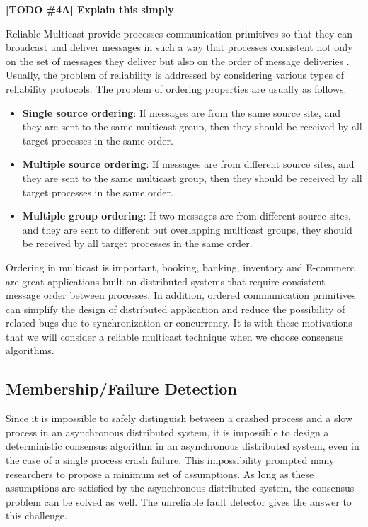 \documentclass[12pt, a4paper]{article}
\newcommand{\todo}[2]{\textbf{\color{blue}[TODO \##1] #2}\par}
\begin{document}
\todo{4A}{Explain this simply}

Reliable Multicast provide processes communication primitives so that they can broadcast and deliver messages in such a way that processes consistent not only on the set of messages they deliver but also on the order of message deliveries \cite{fritzke2001consensus}. Usually, the problem of reliability is addressed by considering various types of reliability protocols. The problem of ordering properties are usually as follows.\cite{garcia1991ordered}

\begin{itemize}
  \item \textbf{Single source ordering}: If messages are from the same source
  site, and they are sent to the same multicast group, then they should be
  received by all target processes in the same order.
  \item \textbf{Multiple source ordering}: If messages are from different
  source sites, and they are sent to the same multicast group,
  then they should be received by all target processes in the same order.
  \item \textbf{Multiple group ordering}: If two messages are from different
  source sites, and they are sent to different but overlapping multicast groups,
  they should be received by all target processes in the same order.
\end{itemize}

Ordering in multicast is important, booking, banking, inventory and E-commerc are great applications built on distributed systems that require consistent message order between processes. In addition, ordered communication primitives can simplify the design of distributed application and reduce the possibility of related bugs due to synchronization or concurrency\cite{garcia1991ordered}. It is with these motivations that we will consider a reliable multicast technique when we choose consensus algorithms.

\subsection{Membership/Failure Detection}
Since it is impossible to safely distinguish between a crashed process and a slow process in an asynchronous distributed system, it is impossible to design a deterministic consensus algorithm in an asynchronous distributed system, even in the case of a single process crash failure\cite{fischer1985impossibility}. This impossibility prompted many researchers to propose a minimum set of assumptions. As long as these assumptions are satisfied by the asynchronous distributed system, the consensus problem can be solved as well. The unreliable fault detector gives the answer to this challenge\cite{chandra1996unreliable}.
\end{document}
